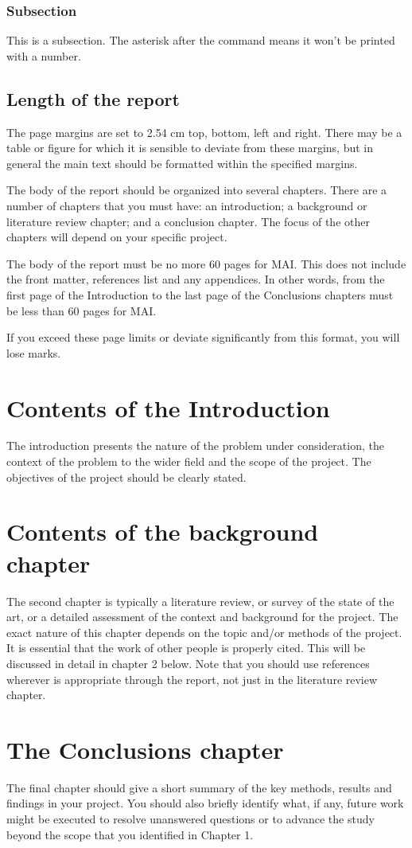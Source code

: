 \subsubsection*{Subsection}
This is a subsection. The asterisk after the command means it won't be printed with a number.

\subsection{Length of the report}
The page margins are set to 2.54 cm top, bottom, left and right. There may be a table or figure for which it is sensible to deviate from these margins, but in general the main text should be formatted within the specified margins.

The body of the report should be organized into several chapters. There are a number of chapters that you must have: an introduction; a background or literature review chapter; and a conclusion chapter. The focus of the other chapters will depend on your specific project.

The body of the report must be no more 60 pages for MAI. This does not include the front matter, references list and any appendices. In other words, from the first page of the Introduction to the last page of the Conclusions chapters must be less than 60 pages for MAI.

If you exceed these page limits or deviate significantly from this format, you will lose marks.

\section{Contents of the Introduction}
The introduction presents the nature of the problem under consideration, the context of the problem to the wider field and the scope of the project. The objectives of the project should be clearly stated.

\section{Contents of the background chapter}
The second chapter is typically a literature review, or survey of the state of the art, or a detailed assessment of the context and background for the project. The exact nature of this chapter depends on the topic and/or methods of the project. It is essential that the work of other people is properly cited. This will be discussed in detail in chapter 2 below. Note that you should use references wherever is appropriate through the report, not just in the literature review chapter.

\section{The Conclusions chapter}
The final chapter should give a short summary of the key methods, results and findings in your project. You should also briefly identify what, if any, future work might be executed to resolve unanswered questions or to advance the study beyond the scope that you identified in Chapter 1.
